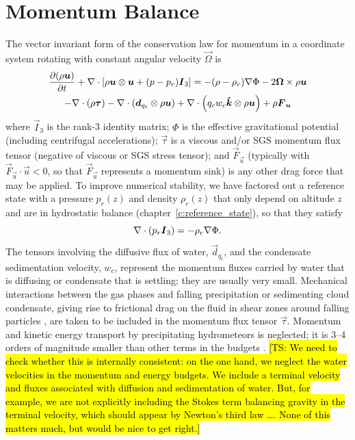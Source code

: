 \documentclass{report}
\begin{document}
\section{Momentum Balance}

The vector invariant form of the conservation law for momentum in a coordinate system rotating with constant angular velocity $\vec{\Omega}$ is 
\begin{multline}
\frac{\partial (\rho\boldsymbol{{u}})}{\partial t} + \nabla \cdot \left[ \rho\boldsymbol{{u}} \otimes \boldsymbol{{u}} + (p - p_r) \boldsymbol{{I}}_3\right] =
- (\rho - \rho_r) \nabla\Phi - 2\boldsymbol{{\Omega}} \times \rho\boldsymbol{{u}} \\
- \nabla \cdot (\rho \boldsymbol{{\tau}}) - \nabla \cdot\left( \boldsymbol{{d}}_{q_t} \otimes \rho\boldsymbol{{u}} \right) + \nabla \cdot \left( q_c w_c \boldsymbol{{\hat k}} \otimes \rho \boldsymbol{{u}} \right) + \rho \boldsymbol{{F}}_{\boldsymbol{{u}}}
\label{e:governing_equations/momentum}
\end{multline}
where $\vec{I}_3$ is the rank-3 identity matrix; $\Phi$ is the effective gravitational potential (including centrifugal accelerations); $\vec{\tau}$ is a viscous and/or SGS momentum flux tensor (negative of viscous or SGS stress tensor); and $\vec{F}_{\vec{u}}$ (typically with $\vec{F}_{\vec{u}}\cdot\vec{u}<0$, so that $\vec{F}_{\vec{u}}$ represents a momentum sink) is any other drag force that may be applied. To improve numerical stability, we have factored out a reference state with a pressure $p_r(z)$ and density $\rho_r(z)$ that only depend on altitude $z$ and are in hydrostatic balance (chapter~\ref{c:reference_state}), so that they satisfy
\[
\nabla \cdot (p_r \boldsymbol{{I}}_3)  = - \rho_r \nabla\Phi. 
\]
The tensors involving the diffusive flux of water, $\vec{d}_{q_t}$, and the condensate sedimentation velocity,  $w_c$, represent the momentum fluxes carried by water that is diffusing or condensate that is settling; they are usually very small. Mechanical interactions between the gas phases and falling precipitation or sedimenting cloud condensate, giving rise to frictional drag on the fluid in shear zones around falling particles \citep{Pauluis00}, are taken to be included in the momentum flux tensor $\vec{\tau}$. Momentum and kinetic energy transport by precipitating hydrometeors is neglected; it is 3--4 orders of magnitude smaller than other terms in the budgets \citep{Romps08a}. \hl{[TS: We need to check whether this is internally consistent: on the one hand, we neglect the water velocities in the  momentum and energy budgets. We include a terminal velocity and fluxes associated with diffusion and sedimentation of water. But, for example, we are not explicitly including the Stokes term balancing gravity in the terminal velocity, which should appear by Newton's third law \dots. None of this matters much, but would be nice to get right.]} 
\end{document}
